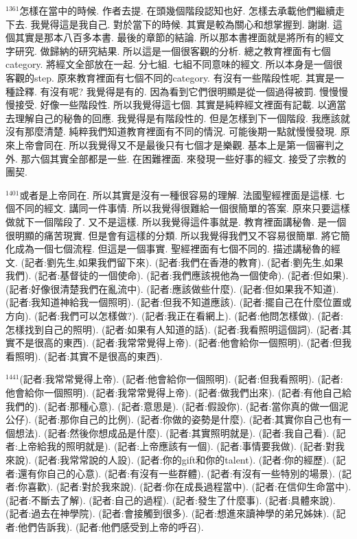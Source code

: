 \documentclass{book}
\begin{document}
$^{1361}$怎樣在當中的時候.
作者去提.
在頭幾個階段認知也好.
怎樣去承載他們繼續走下去.
我覺得這是我自己.
對於當下的時候.
其實是較為關心和想掌握到.
謝謝.
這個其實是那本八百多本書.
最後的章節的結論.
所以那本書裡面就是將所有的經文字研究.
做歸納的研究結果.
所以這是一個很客觀的分析.
總之教育裡面有七個category.
將經文全部放在一起.
分七組.
七組不同意味的經文.
所以本身是一個很客觀的step.
原來教育裡面有七個不同的category.
有沒有一些階段性呢.
其實是一種詮釋.
有沒有呢? 我覺得是有的.
因為看到它們很明顯是從一個過得被罰.
慢慢慢慢接受.
好像一些階段性.
所以我覺得這七個.
其實是純粹經文裡面有記載.
以適當去理解自己的秘魯的回應.
我覺得是有階段性的.
但是怎樣到下一個階段.
我應該就沒有那麼清楚.
純粹我們知道教育裡面有不同的情況.
可能後期一點就慢慢發現.
原來上帝會同在.
所以我覺得又不是最後只有七個才是樂觀.
基本上是第一個審判之外.
那六個其實全部都是一些.
在困難裡面.
來發現一些好事的經文.
接受了宗教的團契.

$^{1401}$或者是上帝同在.
所以其實是沒有一種很容易的理解.
法國聖經裡面是這樣.
七個不同的經文.
講同一件事情.
所以我覺得很難給一個很簡單的答案.
原來只要這樣做就下一個階段了.
又不是這樣.
所以我覺得這件事就是.
教育裡面講秘魯.
是一個很明顯的痛苦現實.
但是會有這樣的分類.
所以我覺得我們又不容易很簡單.
將它簡化成為一個七個流程.
但這是一個事實.
聖經裡面有七個不同的.
描述講秘魯的經文.
(記者:劉先生,如果我們留下來).
(記者:我們在香港的教育).
(記者:劉先生,如果我們).
(記者:基督徒的一個使命).
(記者:我們應該視他為一個使命).
(記者:但如果).
(記者:好像很清楚我們在亂流中).
(記者:應該做些什麼).
(記者:但如果我不知道).
(記者:我知道神給我一個照明).
(記者:但我不知道應該).
(記者:擺自己在什麼位置或方向).
(記者:我們可以怎樣做?).
(記者:我正在看網上).
(記者:他問怎樣做).
(記者:怎樣找到自己的照明).
(記者:如果有人知道的話).
(記者:我看照明這個詞).
(記者:其實不是很高的東西).
(記者:我常常覺得上帝).
(記者:他會給你一個照明).
(記者:但我看照明).
(記者:其實不是很高的東西).

$^{1441}$(記者:我常常覺得上帝).
(記者:他會給你一個照明).
(記者:但我看照明).
(記者:他會給你一個照明).
(記者:我常常覺得上帝).
(記者:做我們出來).
(記者:有他自己給我們的).
(記者:那種心意).
(記者:意思是).
(記者:假設你).
(記者:當你真的做一個泥公仔).
(記者:那你自己的比例).
(記者:你做的姿勢是什麼).
(記者:其實你自己也有一個想法).
(記者:然後你想成品是什麼).
(記者:其實照明就是).
(記者:我自己看).
(記者:上帝給我的照明就是).
(記者:上帝應該有一個).
(記者:事情要我做).
(記者:對我來說).
(記者:我常常說的人設).
(記者:你的gift和你的talent).
(記者:你的經歷).
(記者:還有你自己的心意).
(記者:有沒有一些群體).
(記者:有沒有一些特別的場景).
(記者:你喜歡).
(記者:對於我來說).
(記者:你在成長過程當中).
(記者:在信仰生命當中).
(記者:不斷去了解).
(記者:自己的過程).
(記者:發生了什麼事).
(記者:具體來說).
(記者:過去在神學院).
(記者:會接觸到很多).
(記者:想進來讀神學的弟兄姊妹).
(記者:他們告訴我).
(記者:他們感受到上帝的呼召).
\end{document}
